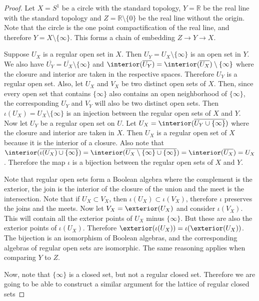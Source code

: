 \begin{proof}
	Let $X=S^1$ be a circle with the standard topology, $Y=\mathbb{R}$ be the real line with the standard topology and $Z=\mathbb{R}\setminus \{0\}$ be the real line without the origin. Note that the circle is the one point compactification of the real line, and therefore $Y=X\setminus \{\infty\}$. This forms a chain of embedding $Z \to Y \to X$.
	
	Suppose $U_X$ is a regular open set in $X$. Then $U_Y = U_X \setminus \{\infty\}$ is an open set in $Y$. We also have $\overline{U_Y} = \overline{U_X} \setminus \{\infty\}$ and $\interior(\overline{U_Y}) = \interior(\overline{U_X}) \setminus \{\infty\}$ where the closure and interior are taken in the respective spaces. Therefore $U_Y$ is a regular open set. Also, let $U_X$ and $V_X$ be two distinct open sets of $X$. Then, since every open set that contains $\{\infty\}$ also contains an open neighborhood of $\{\infty\}$, the corresponding $U_Y$ and $V_Y$ will also be two distinct open sets. Then $\iota(U_X) = U_X \setminus \{\infty\}$ is an injection between the regular open sets of $X$ and $Y$. Now let $U_Y$ be a regular open set on $U$. Let $U_X = \interior(\overline{U_Y \cup \{ \infty \}})$ where the  closure and interior are taken in $X$. Then $U_X$ is a regular open set of $X$ because it is the interior of a closure. Also note that $\interior(\overline{\iota(U_X) \cup \{ \infty \}}) = \interior(\overline{U_X \setminus \{\infty\} \cup \{ \infty \}}) = \interior(\overline{U_X}) = U_X$. Therefore the map $\iota$ is a bijection between the regular open sets of $X$ and $Y$.
	
	Note that regular open sets form a Boolean algebra where the complement is the exterior, the join is the interior of the closure of the union and the meet is the intersection. Note that if $U_X \subset V_X$, then $\iota(U_X) \subset \iota(V_X)$, therefore $\iota$ preserves the joins and the meets. Now let $V_X = \exterior(U_X)$ and consider $\iota(V_X)$. This will contain all the exterior points of $U_X$ minus $\{\infty\}$. But these are also the exterior points of $\iota(U_X)$. Therefore $\exterior(\iota(U_X)) = \iota(\exterior(U_X))$. The bijection is an isomorphism of Boolean algebras, and the corresponding algebras of regular open sets are isomorphic. The same reasoning applies when comparing $Y$ to $Z$.
	
	Now, note that $\{\infty\}$ is a closed set, but not a regular closed set. Therefore we are going to be able to construct a similar argument for the lattice of regular closed sets
\end{proof}


